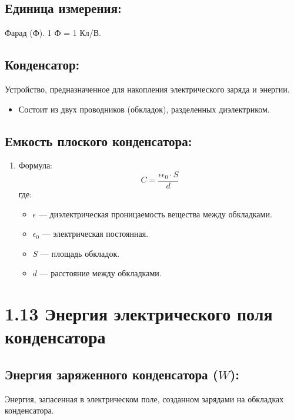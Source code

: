 \documentclass[a4paper,12pt]{article}
\begin{document}
\vspace{-9pt}
\subsection*{Единица измерения:}
\vspace{-3pt}
Фарад (Ф). 1 Ф = 1 Кл/В.

\vspace{-9pt}
\subsection*{Конденсатор:}
\vspace{-3pt}
Устройство, предназначенное для накопления электрического заряда и энергии.
\begin{itemize} [itemsep=0pt, topsep=0pt, parsep=0pt]
  \item Состоит из двух проводников (обкладок), разделенных диэлектриком.
\end{itemize}

\vspace{-9pt}
\subsection*{Емкость плоского конденсатора:}
\vspace{-3pt}
\begin{enumerate}[itemsep=0pt, topsep=0pt, parsep=3pt]
  \item Формула:
  \vspace{-0.05em}
  $$ C = \frac{\epsilon \epsilon_0 \cdot S}{d} $$
  где:
  \begin{itemize} [itemsep=0pt, topsep=0pt, parsep=0pt]
    \item $\epsilon$ — диэлектрическая проницаемость вещества между обкладками.
    \item $\epsilon_0$ — электрическая постоянная.
    \item $S$ — площадь обкладок.
    \item $d$ — расстояние между обкладками.
  \end{itemize}
\end{enumerate}

\newpage
\section*{1.13 Энергия электрического поля конденсатора}

\vspace{-9pt}
\subsection*{Энергия заряженного конденсатора ($W$):}
\vspace{-3pt}
Энергия, запасенная в электрическом поле, созданном зарядами на обкладках конденсатора.
\end{document}
